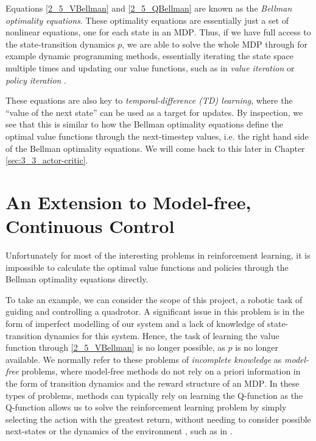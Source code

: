 Equations \eqref{2_5_VBellman} and \eqref{2_5_QBellman} are known as the \textit{Bellman optimality equations}. These optimality equations are essentially just a set of nonlinear equations, one for each state in an MDP$ $. Thus, if we have full access to the state-transition dynamics $p$, we are able to solve the whole MDP through for example dynamic programming methods, essentially iterating the state space multiple times and updating our value functions, such as in \textit{value iteration} or \textit{policy iteration} \cite{suttonAndBartoBook}.

These equations are also key to \textit{temporal-difference (TD) learning}, where the ``value of the next state'' can be used as a target for updates. By inspection, we see that this is similar to how the Bellman optimality equations define the optimal value functions through the next-timestep values, i.e. the right hand side of the Bellman optimality equations. We will come back to this later in Chapter \ref{sec:3_3_actor-critic}.

\section{An Extension to Model-free, Continuous Control}
\label{sec:2_6_modelFreeContinuous}

Unfortunately for most of the interesting problems in reinforcement learning, it is impossible to calculate the optimal value functions and policies through the Bellman optimality equations directly.

To take an example, we can consider the scope of this project, a robotic task of guiding and controlling a quadrotor.
A significant issue in this problem is in the form of imperfect modelling of our system and a lack of knowledge of state-transition dynamics for this system.
Hence, the task of learning the value function through \eqref{2_5_VBellman} is no longer possible, as $p$ is no longer available. 
We normally refer to these problems of \textit{incomplete knowledge} as \textit{model-free} problems, where model-free methods do not rely on a priori information in the form of transition dynamics and the reward structure of an MDP$ $. In these types of problems, methods can typically rely on learning the Q-function as the Q-function allows us to solve the reinforcement learning problem by simply selecting the action with the greatest return, without needing to consider possible next-states or the dynamics of the environment \cite{suttonAndBartoBook}, such as in \cite{watkins1992QLearning}.

